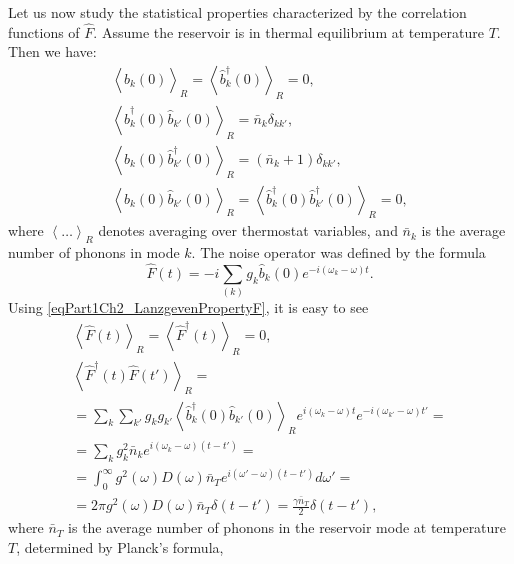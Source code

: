 Let us now study the statistical properties characterized by the correlation functions of $\hat{F}$. Assume the reservoir is in thermal equilibrium at temperature $T$. Then we have:
\begin{eqnarray}
\left<\hat{b}_k\left(0\right)\right>_R = 
\left<\hat{b}_k^{\dag}\left(0\right)\right>_R = 0, 
\nonumber \\
\left<\hat{b}_k^{\dag}\left(0\right)\hat{b}_{k'}\left(0\right)\right>_R = 
\bar{n}_k \delta_{k k'},
\nonumber \\
\left<\hat{b}_k\left(0\right)\hat{b}_{k'}^{\dag}\left(0\right)\right>_R = 
\left(\bar{n}_k + 1\right)\delta_{k k'},
\nonumber \\
\left<\hat{b}_k\left(0\right)\hat{b}_{k'}\left(0\right)\right>_R = 
\left<\hat{b}_k^{\dag}\left(0\right)\hat{b}_{k'}^{\dag}\left(0\right)\right>_R
= 0,
\label{eqPart1Ch2_LanzgevenPropertyF}
\end{eqnarray}
where $\left<\dots\right>_R$ denotes averaging over thermostat variables, and $\bar{n}_k$ is the average number of phonons in mode $k$. The noise operator was defined by the formula 
\begin{equation}
\hat{F}\left(t\right) = -i \sum_{(k)}g_k 
\hat{b}_k\left(0\right)
e^{-i \left(\omega_k - \omega\right)t}.
\label{eqPart1Ch2_LanzgevenDefenitionF}
\end{equation}
Using \eqref{eqPart1Ch2_LanzgevenPropertyF}, it is easy to see
\begin{eqnarray}
\left<\hat{F}\left(t\right)\right>_R =
\left<\hat{F}^{\dag}\left(t\right)\right>_R  = 0,
\nonumber \\
\left<\hat{F}^{\dag}\left(t\right)\hat{F}\left(t'\right)\right>_R = 
\nonumber \\
= \sum_{k}\sum_{k'}g_k g_{k'}
\left<\hat{b}_k^{\dag}\left(0\right)\hat{b}_{k'}\left(0\right)\right>_R 
e^{i\left(\omega_k - \omega\right)t} 
 e^{-i\left(\omega_{k'} - \omega\right)t'} =
\nonumber \\
= \sum_{k}g_k^2 \bar{n}_k 
e^{i\left(\omega_k - \omega\right)\left(t - t'\right)} = 
\nonumber \\
=
\int_0^\infty
g^2\left(\omega\right)D\left(\omega\right)\bar{n}_T
e^{i\left(\omega' - \omega\right)\left(t - t'\right)}d \omega' = 
\nonumber \\
= 2 \pi
g^2\left(\omega\right)D\left(\omega\right)\bar{n}_T
\delta\left(t - t'\right) =
\frac{\gamma \bar{n}_{T}}{2} \delta\left(t - t'\right),
\label{eqPart1Ch2_LanzgevenCorrelations}
\end{eqnarray}
where $\bar{n}_T$ is the average number of phonons in the reservoir mode at temperature $T$, determined by Planck's formula,
